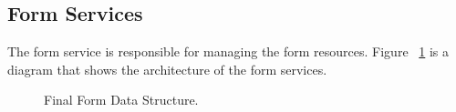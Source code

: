 \subsection{Form Services}

The form service is responsible for managing the form resources.
Figure ~\ref{fig:form_services} is a diagram that shows the architecture of the form services.

\begin{figure}[htbp]
	\begin{center}
	\end{center}
	\caption{Final Form Data Structure.}\label{fig:form_services}
\end{figure}
